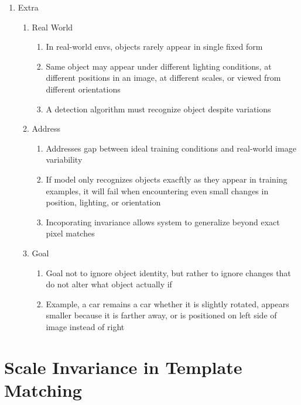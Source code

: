 \documentclass[12pt]{article}
\begin{document}
\begin{enumerate}
    \item Extra
          \begin{enumerate}
              \item Real World
                    \begin{enumerate}
                        \item In real-world envs, objects rarely appear in single fixed form
                        \item Same object may appear under different lighting conditions, at different positions in an image, at different scales, or viewed from different orientations
                        \item A detection algorithm must recognize object despite variations
                    \end{enumerate}
              \item Address
                    \begin{enumerate}
                        \item Addresses gap between ideal training conditions and real-world image variability
                        \item If model only recognizes objects exacftly as they appear in training examples, it will fail when encountering even small changes in position, lighting, or orientation
                        \item Incoporating invariance allows system to generalize beyond exact pixel matches
                    \end{enumerate}
              \item Goal
                    \begin{enumerate}
                        \item Goal not to ignore object identity, but rather to ignore changes that do not alter what object actually if
                        \item Example, a car remains a car whether it is slightly rotated, appears smaller because it is farther away, or is positioned on left side of image instead of right
                    \end{enumerate}
          \end{enumerate}
\end{enumerate}

\section{Scale Invariance in Template Matching}
\end{document}
